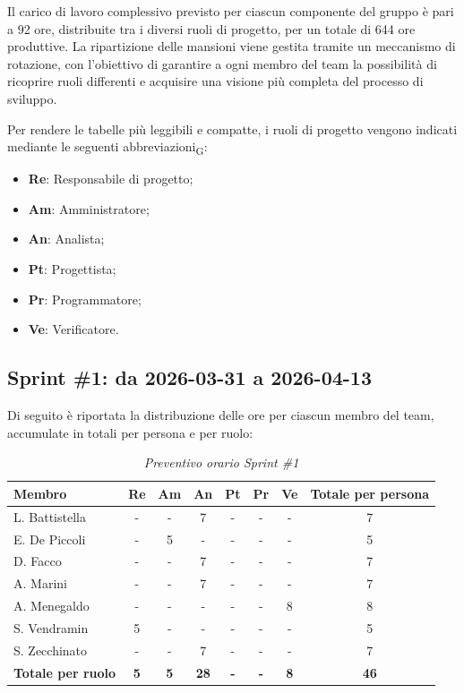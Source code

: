 \documentclass[a4paper, 10pt, colorlinks=true, linkcolor=black, urlcolor=blue, citecolor=blue, hidelinks]{article}
\renewcommand{\arraystretch}{1.2}
\begin{document}
Il carico di lavoro complessivo previsto per ciascun componente del gruppo è pari a 92 ore, distribuite tra i diversi ruoli di progetto, per un totale di 644 ore produttive. La ripartizione delle mansioni viene gestita tramite un meccanismo di rotazione, con l'obiettivo di garantire a ogni membro del team la possibilità di ricoprire ruoli differenti e acquisire una visione più completa del processo di sviluppo.

Per rendere le tabelle più leggibili e compatte, i ruoli di progetto vengono indicati mediante le seguenti abbreviazioni\textsubscript{G}:

\begin{itemize}
    \item \textbf{Re}: Responsabile di progetto;
    \item \textbf{Am}: Amministratore;
    \item \textbf{An}: Analista;
    \item \textbf{Pt}: Progettista;
    \item \textbf{Pr}: Programmatore;
    \item \textbf{Ve}: Verificatore.
\end{itemize}

\subsection{Sprint \#1: da 2026-03-31 a 2026-04-13}
Di seguito è riportata la distribuzione delle ore per ciascun membro del team,
accumulate in totali per persona e per ruolo:

\begin{table}[H]
    \centering
    \renewcommand{\arraystretch}{1.4}
    \begin{tabular}{|l|c|c|c|c|c|c|c|}
        \hline
        \rowcolor{bluBitless!15}
        \textbf{Membro} & \textbf{Re} & \textbf{Am} & \textbf{An} & \textbf{Pt} & \textbf{Pr} & \textbf{Ve} & \textbf{Totale per persona} \\
        \hline
        L. Battistella & - & - & 7 & - & - & - & 7 \\ \hline
        E. De Piccoli & - & 5 & - & - & - & - & 5 \\ \hline
        D. Facco & - & - & 7 & - & - & - & 7 \\ \hline
        A. Marini & - & - & 7 & - & - & - & 7 \\ \hline
        A. Menegaldo & - & - & - & - & - & 8 & 8 \\ \hline
        S. Vendramin & 5 & - & - & - & - & - & 5 \\ \hline
        S. Zecchinato & - & - & 7 & - & - & - & 7 \\ \hline
        \rowcolor{bluBitless!8}
        \textbf{Totale per ruolo} & \textbf{5} & \textbf{5} & \textbf{28} & \textbf{-} & \textbf{-} & \textbf{8} & \textbf{46} \\
        \hline
    \end{tabular}
    \caption{\textit{Preventivo orario Sprint \#1}}
\end{table}
\end{document}
